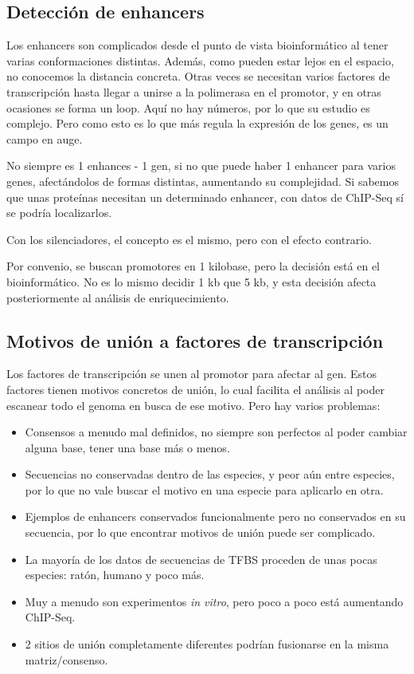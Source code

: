 \subsection{Detección de enhancers}
Los enhancers son complicados desde el punto de vista bioinformático al tener varias conformaciones distintas. Además, como pueden estar lejos en el espacio, no conocemos la distancia concreta. Otras veces se necesitan varios factores de transcripción hasta llegar a unirse a la polimerasa en el promotor, y en otras ocasiones se forma un loop. Aquí no hay números, por lo que su estudio es complejo. Pero como esto es lo que más regula la expresión de los genes, es un campo en auge. 

No siempre es 1 enhances - 1 gen, si no que puede haber 1 enhancer para varios genes, afectándolos de formas distintas, aumentando su complejidad. Si sabemos que unas proteínas necesitan un determinado enhancer, con datos de ChIP-Seq sí se podría localizarlos.

Con los silenciadores, el concepto es el mismo, pero con el efecto contrario. 

Por convenio, se buscan promotores en 1 kilobase, pero la decisión está en el bioinformático. No es lo mismo decidir 1 kb que 5 kb, y esta decisión afecta posteriormente al análisis de enriquecimiento. 

\subsection{Motivos de unión a factores de transcripción}
Los factores de transcripción se unen al promotor para afectar al gen. Estos factores tienen motivos concretos de unión, lo cual facilita el análisis al poder escanear todo el genoma en busca de ese motivo. Pero hay varios problemas:
\begin{itemize}
\item Consensos a menudo mal definidos, no siempre son perfectos al poder cambiar alguna base, tener una base más o menos.
\item Secuencias no conservadas dentro de las especies, y peor aún entre especies, por lo que no vale buscar el motivo en una especie para aplicarlo en otra.
\item Ejemplos de enhancers conservados funcionalmente pero no conservados en su secuencia, por lo que encontrar motivos de unión puede ser complicado.
\item La mayoría de los datos de secuencias de TFBS proceden de unas pocas especies: ratón, humano y poco más.
\item Muy a menudo son experimentos \textit{in vitro}, pero poco a poco está aumentando ChIP-Seq.
\item 2 sitios de unión completamente diferentes podrían fusionarse en la misma matriz/consenso. 
\end{itemize}

